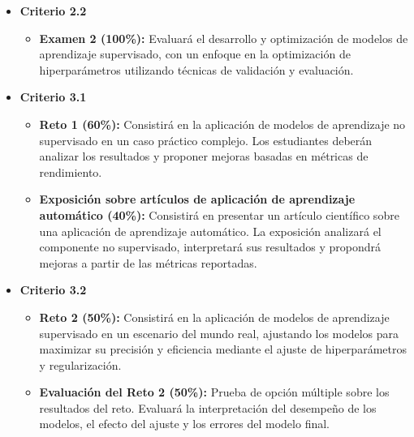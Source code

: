 \documentclass[a4,11pt]{aleph-notas}
\begin{document}
\begin{itemize}[leftmargin=*]
    \item \textbf{Criterio 2.2}
        \begin{itemize}[leftmargin=*]
            \item \textbf{Examen 2 (100\%):} Evaluará el desarrollo y optimización de modelos de aprendizaje supervisado, con un enfoque en la optimización de hiperparámetros utilizando técnicas de validación y evaluación.
        \end{itemize}
    \item \textbf{Criterio 3.1}
        \begin{itemize}[leftmargin=*]
            \item \textbf{Reto 1 (60\%):} Consistirá en la aplicación de modelos de aprendizaje no supervisado en un caso práctico complejo. Los estudiantes deberán analizar los resultados y proponer mejoras basadas en métricas de rendimiento.
            \item \textbf{Exposición sobre artículos de aplicación de aprendizaje automático (40\%):} Consistirá en presentar un artículo científico sobre una aplicación de aprendizaje automático. La exposición analizará el componente no supervisado, interpretará sus resultados y propondrá mejoras a partir de las métricas reportadas.
        \end{itemize}
    \item \textbf{Criterio 3.2}
        \begin{itemize}[leftmargin=*]
            \item \textbf{Reto 2 (50\%):} Consistirá en la aplicación de modelos de aprendizaje supervisado en un escenario del mundo real, ajustando los modelos para maximizar su precisión y eficiencia mediante el ajuste de hiperparámetros y regularización.
            \item \textbf{Evaluación del Reto 2 (50\%):} Prueba de opción múltiple sobre los resultados del reto. Evaluará la interpretación del desempeño de los modelos, el efecto del ajuste y los errores del modelo final.
        \end{itemize}
\end{itemize}
\end{document}
